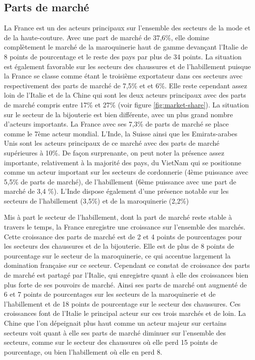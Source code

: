 \documentclass[french,10pt,a4paper]{article}
\begin{document}
\subsection{Parts de marché}

La France est un des acteurs principaux sur l'ensemble des secteurs de la mode et de la haute-couture. Avec une part de marché de 37,6\%, elle domine complètement le marché de la maroquinerie haut de gamme devançant l'Italie de 8 points de pourcentage et le reste des pays par plus de 34 points. La situation est également favorable sur les secteurs des chaussures et de l'habillement puisque la France se classe comme étant le troisième exportateur dans ces secteurs avec respectivement des parts de marché de 7,5\% et et 6\%. Elle reste cependant assez loin de l'Italie et de la Chine qui sont les deux acteurs principaux avec des parts de marché compris entre 17\% et 27\% (voir figure \ref{fig:market-share}). La situation sur le secteur de la bijouterie est bien différente, avec un plus grand nombre d'acteurs importants. La France avec ses 7,3\% de parts de marché se place comme le 7ème acteur mondial. L'Inde, la Suisse ainsi que les Emirats-arabes Unis sont les acteurs principaux de ce marché avec des parts de marché supérieures à 10\%. De façon surprenante, on peut noter la présence assez importante, relativement à la majorité des pays, du VietNam qui se positionne comme un acteur important sur les secteurs de cordonnerie (4ème puissance avec 5,5\% de parts de marché), de l'habillement (6ème puissance avec une part de marché de 3,4 \%). L'Inde dispose également d'une présence notable sur les secteurs de l'habillement (3,5\%) et de la maroquinerie (2,2\%)

Mis à part le secteur de l'habillement, dont la part de marché reste stable à travers le temps, la France enregistre une croissance sur l'ensemble des marchés. Cette croissance des parts de marché est de 2 et 4 points de pourcentages pour les secteurs des chaussures et de la bijouterie. Elle est de plus de 8 points de pourcentage sur le secteur de la maroquinerie, ce qui accentue largement la domination française sur ce secteur. Cependant ce constat de croissance des parts de marché est partagé par l'Italie, qui enregistre quant à elle des croissances bien plus forte de ses pouvoirs de marché. Ainsi ses parts de marché ont augmenté de 6 et 7 points de pourcentages sur les secteurs de la maroquinerie et de l'habillement et de 18 points de pourcentage sur le secteur des chaussures. Ces croissances font de l'Italie le principal acteur sur ces trois marchés et de loin. La Chine que l'on dépeignait plus haut comme un acteur majeur sur certains secteurs voit quant à elle ses parts de marché diminuer sur l'ensemble des secteurs, comme sur le secteur des chaussures où elle perd 15 points de pourcentage, ou bien l'habillement où elle en perd 8. 
\end{document}
